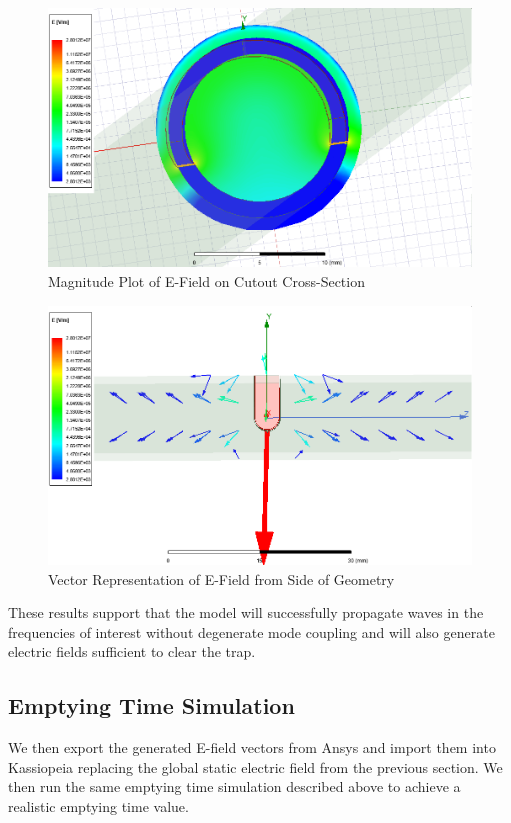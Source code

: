 \documentclass[12pt,letterpaper]{article}
\begin{document}
    \begin{figure}[H]
    \centering
    \includegraphics[width=0.9\linewidth]{img/emag_cutout.png}
    \caption{Magnitude Plot of E-Field on Cutout Cross-Section}
    \end{figure}
    
    \begin{figure}[H]
    \centering
    \includegraphics[width=0.9\linewidth]{img/evec_side.png}
    \caption{Vector Representation of E-Field from Side of Geometry}
    \end{figure}
    
These results support that the model will successfully propagate waves in the frequencies of interest without degenerate mode coupling and will also generate electric fields sufficient to clear the trap. 

\subsection*{Emptying Time Simulation}

We then export the generated E-field vectors from Ansys and import them into Kassiopeia replacing the global static electric field from the previous section. We then run the same emptying time simulation described above to achieve a realistic emptying time value. 
\end{document}
